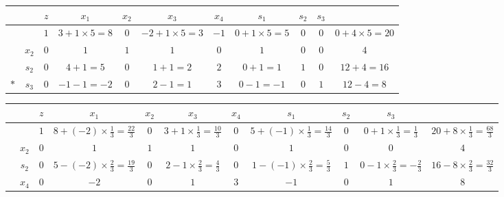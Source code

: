 \documentclass[a4paper,12pt]{article}
\begin{document}
\begin{table}[H]
    \tiny
    \begin{tabularx}{\textwidth}{cc|cccccccc|c}
            &       & $z$ & $x_1$                & $x_2$ & $x_3$                 & $x_4$ & $s_1$                & $s_2$ & $s_3$                         \\
        \hline
            &       & $1$ & $3 + 1 \times 5 = 8$ & $0$   & $-2 + 1 \times 5 = 3$ & $-1$  & $0 + 1 \times 5 = 5$ & $0$   & $0$   & $0 + 4 \times 5 = 20$ \\
        \hline
            & $x_2$ & $0$ & $1$                  & $1$   & $1$                   & $0$   & $1$                  & $0$   & $0$   & $4$                   \\
            & $s_2$ & $0$ & $4 + 1 = 5 $         & $0$   & $1 + 1 = 2$           & $2$   & $0 + 1 = 1$          & $1$   & $0$   & $12 + 4 = 16$         \\
        $*$ & $s_3$ & $0$ & $-1 - 1 = -2$        & $0$   & $2 - 1 = 1$           & $3$   & $0 - 1 = -1$         & $0$   & $1$   & $12 - 4 = 8$          \\
    \end{tabularx}
\end{table}

\begin{table}[H]
    \tiny
    \begin{tabularx}{\textwidth}{cc|cccccccc|c}
         &       & $z$ & $x_1$                                        & $x_2$ & $x_3$                                     & $x_4$ & $s_1$                                        & $s_2$ & $s_3$                                                                                  \\
        \hline
         &       & $1$ & $8 + (-2) \times \frac{1}{3} = \frac{22}{3}$ & $0$   & $3 + 1 \times \frac{1}{3} = \frac{10}{3}$ & $0$   & $5 + (-1) \times \frac{1}{3} = \frac{14}{3}$ & $0$   & $0 + 1 \times \frac{1}{3} = \frac{1}{3}$  & $20 + 8 \times \frac{1}{3} = \frac{68}{3}$ \\
        \hline
         & $x_2$ & $0$ & $1$                                          & $1$   & $1$                                       & $0$   & $1$                                          & $0$   & $0$                                       & $4$                                        \\
         & $s_2$ & $0$ & $5 - (-2) \times \frac{2}{3} = \frac{19}{3}$ & $0$   & $2 - 1 \times \frac{2}{3} = \frac{4}{3}$  & $0$   & $1 - (-1) \times \frac{2}{3} = \frac{5}{3}$  & $1$   & $0 - 1 \times \frac{2}{3} = -\frac{2}{3}$ & $16 - 8 \times \frac{2}{3} = \frac{32}{3}$ \\
         & $x_4$ & $0$ & $-2$                                         & $0$   & $1$                                       & $3$   & $-1$                                         & $0$   & $1$                                       & $8$                                        \\
    \end{tabularx}
\end{table}
\end{document}
